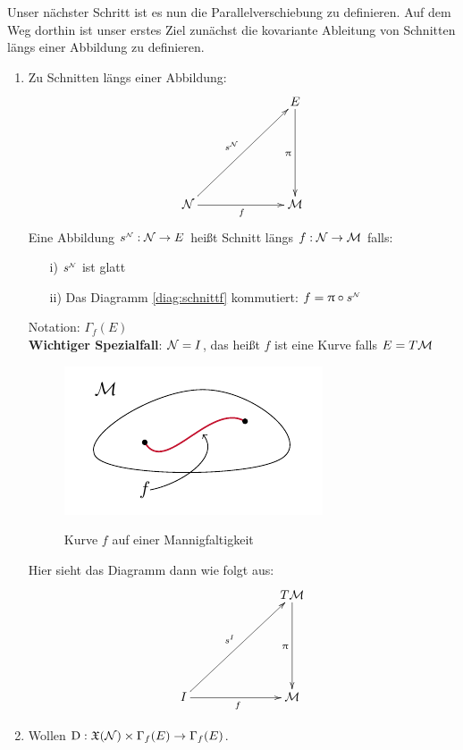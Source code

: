 
Unser nächster Schritt ist es nun die Parallelverschiebung zu definieren.
Auf dem Weg dorthin ist unser erstes Ziel zunächst die kovariante Ableitung von Schnitten längs einer Abbildung zu definieren.
\begin{enumerate}
\item Zu Schnitten längs einer Abbildung:
\begin{align}
\label{diag:schnittf}
\begin{xy}
  \xymatrix@=0.2\linewidth{
          &   E \ar[d]_{\pi} \\
      \mfka \ar[ur]^{s^\text{{\begin{tiny}$\mfka$\end{tiny}}}}  \ar[r]_f  &   \mfk
  }
\end{xy}
\end{align}
Eine Abbildung $s^\text{{\begin{tiny}$\mfka$\end{tiny}}} : \mfka \to E$ heißt Schnitt längs $f: \mathcal{N} \to \mathcal{M}$ falls:
\begin{enumerate}
  \item[i)]  $s^\text{{\begin{tiny}$\mfka$\end{tiny}}}$ ist glatt
  \item[ii)]  Das Diagramm \ref{diag:schnittf} kommutiert: $f = \pi \circ s^\text{{\begin{tiny}$\mfka$\end{tiny}}}$
\end{enumerate}
Notation: $\Gamma_f (E)$\\
\textbf{Wichtiger Spezialfall}: $\mathcal{N} = I$, das heißt $f$ ist eine Kurve falls $E = T\mathcal{M}$
\begin{figure}[H]
\centering
\includegraphics[width=0.4\linewidth]{figures/tikz/curve_on_manifold.pdf}
\label{img:curve_on_manifold}
\caption{Kurve $f$ auf einer Mannigfaltigkeit}
\end{figure} 
Hier sieht das Diagramm dann wie folgt aus:
\begin{align}
\begin{xy}
  \xymatrix@=0.2\linewidth{
          &   T\mfk \ar[d]_{\pi} \\
      I \ar[ur]^{s^I} \ar[r]_f  &   \mfk
  }
\end{xy}
\end{align}
\item Wollen $\mathrm{D}: \mathfrak{X}(\mathcal{N}) \times \Gamma_f (E) \to \Gamma_f (E)$.
\end{enumerate}

